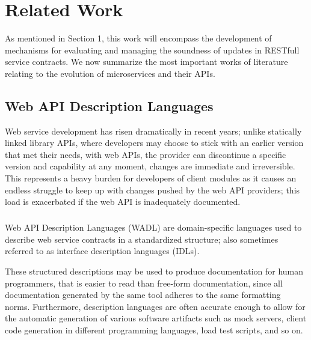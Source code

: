 
%

\chapter{Related Work}
\label{cha:related_work}

As mentioned in Section 1, this work will encompass the development of
mechanisms for evaluating and managing the soundness of updates in RESTfull service contracts.
We now summarize the most important works of literature relating to the evolution of microservices and their APIs.

\section{Web API Description Languages} %
\label{sec:web_api_description_languages}

Web service development has risen dramatically in recent years;  unlike statically linked library APIs,
where developers may choose to stick with an earlier version that met their needs, with web APIs,
the provider can discontinue a specific version and capability at any moment, changes are immediate and irreversible.
This represents a heavy burden for developers of client modules as it causes an endless struggle to keep up
with changes pushed by the web API providers; this load is exacerbated if the web API is inadequately documented.

\paragraph{}

Web API Description Languages (WADL) are domain-specific languages used to describe web service contracts in a standardized structure;
also sometimes referred to as interface description languages (IDLs).

These structured descriptions may be used to produce documentation for human programmers, that is easier to read than free-form documentation,
since all documentation generated by the same tool adheres to the same formatting norms.
Furthermore, description languages are often accurate enough to allow for the automatic generation of various software artifacts such as mock servers,
client code generation in different programming languages, load test scripts, and so on.

